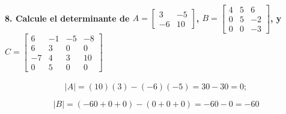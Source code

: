 \documentclass[
]{article}
\begin{document}
\hypertarget{calcule-el-determinante-de-a-beginbmatrix-3-5-610endbmatrix-b-beginbmatrix45605-200-3endbmatrix-y-c-beginbmatrix6-1-5-86300-743100500endbmatrix}{%
\paragraph{\texorpdfstring{8. Calcule el determinante de
\(A = \begin{bmatrix} 3&-5\\-6&10\end{bmatrix}\),
\(B = \begin{bmatrix}4&5&6\\0&5&-2\\0&0&-3\end{bmatrix}\), y
\(C = \begin{bmatrix}6&-1&-5&-8\\6&3&0&0\\-7&4&3&10\\0&5&0&0\end{bmatrix}\)}{8. Calcule el determinante de A = \textbackslash begin\{bmatrix\} 3\&-5\textbackslash\textbackslash-6\&10\textbackslash end\{bmatrix\}, B = \textbackslash begin\{bmatrix\}4\&5\&6\textbackslash\textbackslash0\&5\&-2\textbackslash\textbackslash0\&0\&-3\textbackslash end\{bmatrix\}, y C = \textbackslash begin\{bmatrix\}6\&-1\&-5\&-8\textbackslash\textbackslash6\&3\&0\&0\textbackslash\textbackslash-7\&4\&3\&10\textbackslash\textbackslash0\&5\&0\&0\textbackslash end\{bmatrix\}}}\label{calcule-el-determinante-de-a-beginbmatrix-3-5-610endbmatrix-b-beginbmatrix45605-200-3endbmatrix-y-c-beginbmatrix6-1-5-86300-743100500endbmatrix}}

\[
|A| = (10)(3)-(-6)(-5) = 30-30 = 0;
\]

\[
|B| = (-60+0+0) - (0+0+0) = -60-0 = -60
\]
\end{document}
